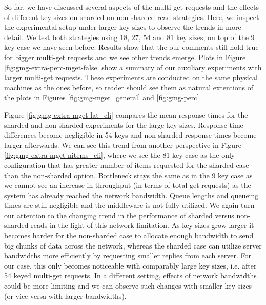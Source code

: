 \documentclass[11pt,a4paper]{article}
\begin{document}
So far, we have discussed several aspects of the multi-get requests and the effects of different key sizes on sharded on non-sharded read strategies. Here, we inspect the experimental setup under larger key sizes to observe the trends in more detail. We test both strategies using 18, 27, 54 and 81 key sizes, on top of the 9 key case we have seen before. Results show that the our comments still hold true for bigger multi-get requests and we see other trends emerge. Plots in Figure \ref{fig:gmg-extra-perc-mget-false} show a summary of our auxiliary experiments with larger multi-get requests. These experiments are conducted on the same physical machines as the ones before, so reader should see them as natural extentions of the plots in Figures \ref{fig:gmg-mget_general} and \ref{fig:gmg-perc}.
\par Figure \ref{fig:gmg-extra-mget-lat_cli} compares the mean response times for the sharded and non-sharded experiments for the large key sizes. Response time differences become negligible in 54 keys and non-sharded response times become larger afterwards. We can see this trend from another perspective in Figure \ref{fig:gmg-extra-mget-nitems_cli}, where we see the 81 key case as the only configuration that has greater number of items requested for the sharded case than the non-sharded option. Bottleneck stays the same as in the 9 key case as we cannot see an increase in throughput (in terms of total get requests) as the system has already reached the network bandwidth. Queue lengths and queueing times are still negligible and the middleware is not fully utilized. We again turn our attention to the changing trend in the performance of sharded versus non-sharded reads in the light of this network limitation. As key sizes grow larger it becomes harder for the non-sharded case to allocate enough bandwidth to send big chunks of data across the network, whereas the sharded case can utilize server bandwidths more efficiently by requesting smaller replies from each server. For our case, this only becomes noticeable with comparably large key sizes, i.e. after 54 keyed multi-get requests. In a different setting, effects of network bandwidths could be more limiting and we can observe such changes with smaller key sizes (or vice versa with larger bandwidths).
\end{document}
